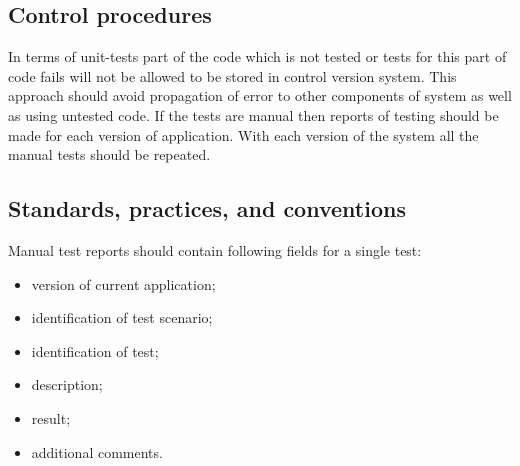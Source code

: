\subsection{Control procedures} \label{s:details-of-the-master-test-plan:control-procedures}
	\begin{comment}
		$<$ Identify control procedures applied to the test activities. These procedures describe how the softwarebased system and software products and test results will be configured, protected, and stored.\\
		These procedures may describe quality assurance, configuration management, data management, or other activities if they are not addressed by other efforts. Describe how the test activities comply with existing security provisions and how the test results are to be protected from unauthorized alterations. $>$
	\end{comment}
	In terms of unit-tests part of the code which is not tested or tests for this part of code fails will not be allowed to be stored in control version system. This approach should avoid propagation of error to other components of system as well as using untested code. If the tests are manual then reports of testing should be made for each version of application. With each version of the system all the manual tests should be repeated.
\subsection{Standards, practices, and conventions} \label{s:details-of-the-master-test-plan:standards-practices-and-conventions}
	\begin{comment}
		$<$ Identify the standards, practices, and conventions that govern the performance of testing tasks including, but not limited to, internal organizational standards, practices, and policies. $>$
	\end{comment}
	Manual test reports should contain following fields for a single test:
	\begin{itemize}
		\item version of current application;
		\item identification of test scenario;
		\item identification of test;
		\item description;
		\item result;
		\item additional comments.
	\end{itemize}
